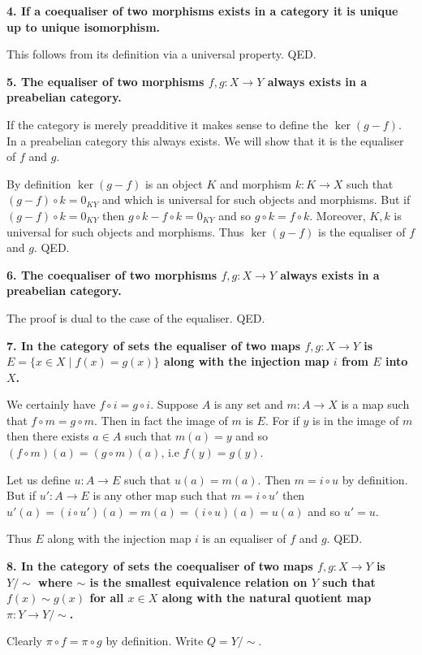 \documentclass[12pt]{article}
\begin{document}
\textbf{4. If a coequaliser of two morphisms exists in a category it is unique up to unique isomorphism.}

This follows from its definition via a universal property. QED.

\textbf{5. The equaliser of two morphisms $f, g : X \to Y$  always exists in a preabelian category.}

If the category is merely preadditive it makes sense to define the $\ker(g - f)$. In a preabelian category this always exists. We will show that it is the equaliser of $f$ and $g$.

By definition $\ker(g - f)$ is an object $K$ and morphism $k : K \to X$ such that $(g - f)\circ k = 0_{KY}$ and which is universal for such objects and morphisms. But if $(g - f)\circ k = 0_{KY}$ then $g\circ k - f\circ k = 0_{KY}$ and so $g\circ k = f\circ k$. Moreover, $K, k$ is universal for such objects and morphisms. Thus $\ker(g - f)$ is the equaliser of $f$ and $g$. QED.

\textbf{6. The coequaliser of two morphisms $f, g : X \to Y$  always exists in a preabelian category.}

The proof is dual to the case of the equaliser. QED.

\textbf{7. In the category of sets the equaliser of two maps $f, g : X \to Y$ is $E = \{x \in X \;|\; f(x) = g(x)\}$ along with the injection map $i$ from $E$ into $X$.}

We certainly have $f\circ i = g\circ i$. Suppose $A$ is any set and $m : A \to X$ is a map such that $f\circ m = g\circ m$. Then in fact the image of $m$ is $E$. For if $y$ is in the image of $m$ then there exists $a \in A$ such that $m(a) = y$ and so $(f\circ m)(a) = (g\circ m)(a)$, i.e $f(y) = g(y)$.

Let us define $u : A \to E$ such that $u(a) = m(a)$. Then $m = i\circ u$ by definition. But if $u' : A \to E$ is any other map such that $m = i\circ u'$ then $u'(a) = (i\circ u')(a) = m(a) = (i\circ u)(a) = u(a)$ and so $u' = u$.

Thus $E$ along with the injection map $i$ is an equaliser of $f$ and $g$. QED.

\textbf{8. In the category of sets the coequaliser of two maps $f, g : X \to Y$ is $Y/\sim$ where $\sim$ is the smallest equivalence relation on $Y$ such that $f(x) \sim g(x)$ for all $x \in X$ along with the natural quotient map $\pi : Y \to Y/\sim$.}

Clearly $\pi\circ f = \pi\circ g$ by definition. Write $Q = Y/\sim$.
\end{document}
